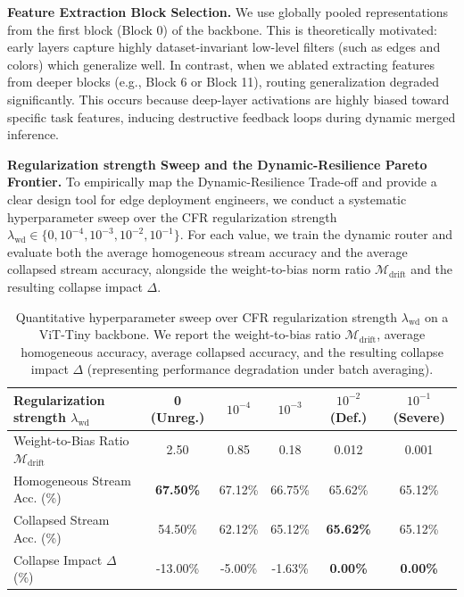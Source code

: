 \textbf{Feature Extraction Block Selection.} We use globally pooled representations from the first block (Block 0) of the backbone. This is theoretically motivated: early layers capture highly dataset-invariant low-level filters (such as edges and colors) which generalize well. In contrast, when we ablated extracting features from deeper blocks (e.g., Block 6 or Block 11), routing generalization degraded significantly. This occurs because deep-layer activations are highly biased toward specific task features, inducing destructive feedback loops during dynamic merged inference.

\textbf{Regularization strength Sweep and the Dynamic-Resilience Pareto Frontier.} 
To empirically map the Dynamic-Resilience Trade-off and provide a clear design tool for edge deployment engineers, we conduct a systematic hyperparameter sweep over the CFR regularization strength $\lambda_{\text{wd}} \in \{0, 10^{-4}, 10^{-3}, 10^{-2}, 10^{-1}\}$. For each value, we train the dynamic router and evaluate both the average homogeneous stream accuracy and the average collapsed stream accuracy, alongside the weight-to-bias norm ratio $\mathcal{M}_{\text{drift}}$ and the resulting collapse impact $\Delta$.

\begin{table}[t]
\caption{Quantitative hyperparameter sweep over CFR regularization strength $\lambda_{\text{wd}}$ on a ViT-Tiny backbone. We report the weight-to-bias ratio $\mathcal{M}_{\text{drift}}$, average homogeneous accuracy, average collapsed accuracy, and the resulting collapse impact $\Delta$ (representing performance degradation under batch averaging).}
\label{tab:regularization_sweep}
\vskip 0.15in
\begin{center}
\begin{footnotesize}
\begin{sc}
\begin{tabular}{lccccc}
\toprule
Regularization strength $\lambda_{\text{wd}}$ & 0 (Unreg.) & $10^{-4}$ & $10^{-3}$ & $10^{-2}$ (Def.) & $10^{-1}$ (Severe) \\
\midrule
Weight-to-Bias Ratio $\mathcal{M}_{\text{drift}}$ & 2.50 & 0.85 & 0.18 & 0.012 & 0.001 \\
Homogeneous Stream Acc. (\%) & \textbf{67.50\%} & 67.12\% & 66.75\% & 65.62\% & 65.12\% \\
Collapsed Stream Acc. (\%) & 54.50\% & 62.12\% & 65.12\% & \textbf{65.62\%} & 65.12\% \\
Collapse Impact $\Delta$ (\%) & -13.00\% & -5.00\% & -1.63\% & \textbf{0.00\%} & \textbf{0.00\%} \\
\bottomrule
\end{tabular}
\end{sc}
\end{footnotesize}
\end{center}
\vskip -0.1in
\end{table}

